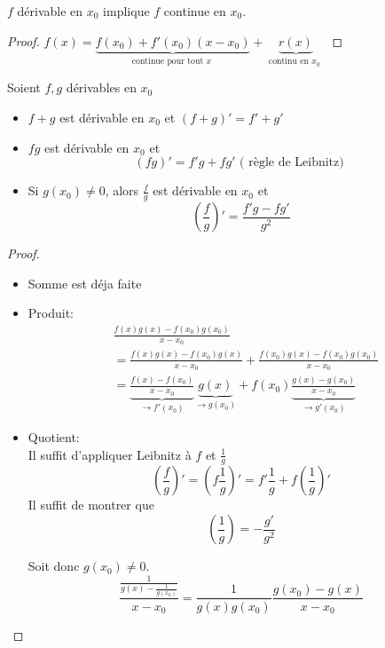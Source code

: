 \documentclass[../main.tex]{subfiles}
\begin{document}
\begin{crly}
$f$ dérivable en $x_0$ implique $f$ continue en $x_0$.
\end{crly}
\begin{proof}
	$f( x) = \underbrace{f( x_0) + f'( x_0) (  x-x_0)}_{ \text{ continue pour tout $x$ } } + \underbrace{r( x)}_{ \text{ continu en $x_0$ } } $
\end{proof}
\begin{propo}
Soient $f,g$ dérivables en $x_0$ 
\begin{itemize}
	\item $f+g$ est dérivable en $x_0$ et $( f+g) ' = f' + g'$
	\item $fg$ est dérivable en $x_0$ et 
		\[ 
			( fg) ' = f'g + fg' \text{ ( règle de Leibnitz)  } 
		\]
	
	\item Si $g( x_0)  \neq 0$, alors $\frac{f}{g}$ est dérivable en $x_0$ et
		\[ 
			( \frac{f}{g}) ' = \frac{f'g- fg'}{g^{2}}
		\]
		
		
\end{itemize}

\end{propo}
\begin{proof}
\begin{itemize}
\item Somme est déja faite
\item Produit:
	\begin{align*}
		&\frac{f( x) g( x) - f( x_0) g( x_0) }{x-x_0} \\
		&=\frac{f( x) g( x) - f( x_0) g( x) }{x-x_0} + \frac{f(x_0) g( x) - f( x_0) g( x_0)   }{x-x_0}\\
		&= \underbrace{\frac{f( x) - f( x_0) }{x-x_0}}_{\to f'( x_0) 	} \underbrace{g( x)}_{\to g( x_0) }  + f( x_0) \underbrace{\frac{g( x) - g( x_0) }{x-x_0}}_{\to g'( x_0)}
	\end{align*}

\item Quotient:\\
	Il suffit d'appliquer Leibnitz à $f$ et $\frac{1}{g}$ 
	\[ 
		\left( \frac{f}{g}\right) ' = \left( f \frac{1}{g}\right) ' = f' \frac{1}{g} + f \left( \frac{1}{g}\right) ' 
	\]
	Il suffit de montrer que
	\[ 
	\left( \frac{1}{g} \right) = - \frac{g'}{g^{2}}
	\]
	
	Soit donc $g( x_0) \neq 0$.
	\[ 
		\frac{\frac{1}{g( x) - \frac{1}{g( x_0) }}}{x-x_0} = \frac{1}{g( x) g( x_0) } \frac{g( x_0) - g( x) }{x-x_0}
	\]

	

\end{itemize}

\end{proof}
\end{document}
